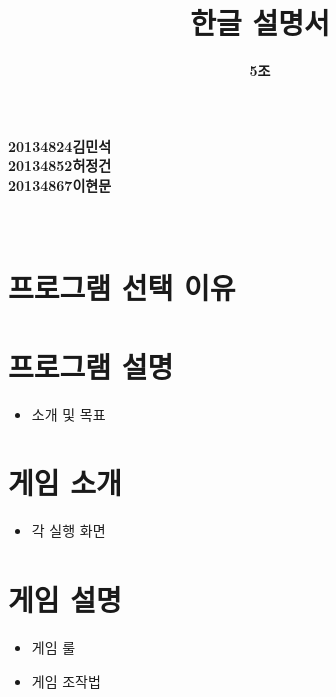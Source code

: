 \documentclass[a4paper, 11pt]{article}
\title{\textbf{\Huge오목 한글 설명서}}
\author{\textbf{\LARGE5조}}
\begin{document}
	
	\maketitle
	
	\vspace{6cm}
	\begin{center}
		\textbf{\large20134824김민석}\\
		\textbf{\large20134852허정건}\\
		\textbf{\large20134867이현문}\\
	\end{center}
	
	
	
	
	\maketitle
	\newpage
	\thispagestyle{empty}        
	\mbox{}
		
	\begin{center} 
		\textbf{}\\
	\end{center}
	\vspace{0.5cm}
\section{프로그램 선택 이유}
	\vspace{0.5cm}
	\section{프로그램 설명}
	\begin{itemize}
		\item 소개 및 목표
	\end{itemize}
	
	\section{게임 소개}
		\begin{itemize}
		\item 각 실행 화면
	\end{itemize}

	
	\section{게임 설명}
	\begin{itemize}
		\item 게임 룰
		\item 게임 조작법
	\end{itemize}
	
\end{document}
